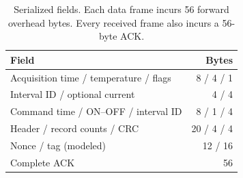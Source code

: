 \begin{table}[!htb]\centering\small
\caption{Serialized fields. Each data frame incurs 56 forward overhead bytes. Every received frame also incurs a 56-byte ACK.}\label{tab:wire}
\begin{tabular}{@{}lr@{}}\toprule
Field & Bytes\\\midrule
Acquisition time / temperature / flags & 8 / 4 / 1\\
Interval ID / optional current & 4 / 4\\
Command time / ON--OFF / interval ID & 8 / 1 / 4\\
Header / record counts / CRC & 20 / 4 / 4\\
Nonce / tag (modeled) & 12 / 16\\
Complete ACK & 56\\
\bottomrule\end{tabular}\end{table}
